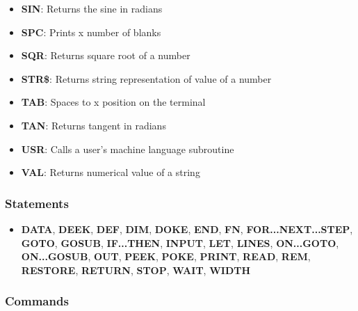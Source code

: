 \documentclass[a4paper,11pt]{article}
\begin{document}
\begin{itemize}
        \item \textbf{SIN}: Returns the sine in radians
        \item \textbf{SPC}: Prints x number of blanks
        \item \textbf{SQR}: Returns square root of a number
        \item \textbf{STR\$}: Returns string representation of value of a number
        \item \textbf{TAB}: Spaces to x position on the terminal
        \item \textbf{TAN}: Returns tangent in radians
        \item \textbf{USR}: Calls a user's machine language subroutine
        \item \textbf{VAL}: Returns numerical value of a string
    \end{itemize}

    \subsubsection{Statements}

    \begin{itemize}
        \item \textbf{DATA}, \textbf{DEEK}, \textbf{DEF}, \textbf{DIM},
        \textbf{DOKE}, \textbf{END}, \textbf{FN}, \textbf{FOR...NEXT...STEP},
        \textbf{GOTO}, \textbf{GOSUB}, \textbf{IF...THEN}, \textbf{INPUT},
        \textbf{LET}, \textbf{LINES}, \textbf{ON...GOTO}, \textbf{ON...GOSUB},
        \textbf{OUT}, \textbf{PEEK}, \textbf{POKE}, \textbf{PRINT},
        \textbf{READ}, \textbf{REM}, \textbf{RESTORE}, \textbf{RETURN},
        \textbf{STOP}, \textbf{WAIT}, \textbf{WIDTH}
    \end{itemize}

    \subsubsection{Commands}
\end{document}
